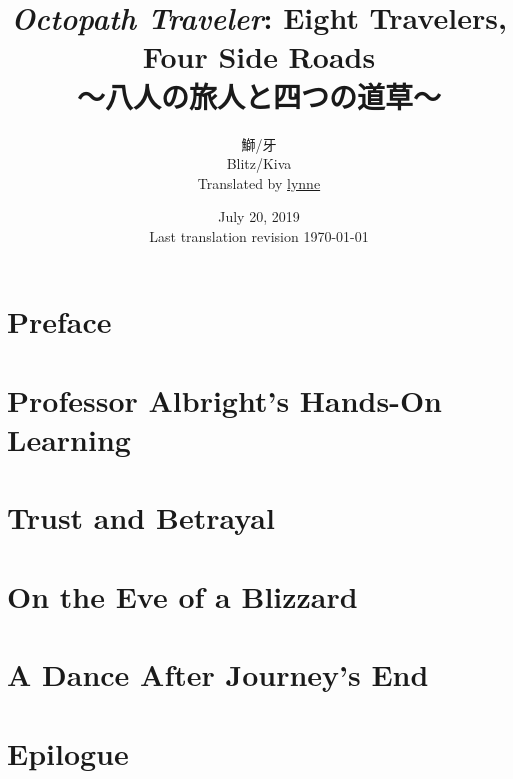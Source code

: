 \documentclass[a4paper,11pt]{memoir}
\title{%
\emph{Octopath Traveler}: Eight Travelers, Four Side Roads \\
\large{～八人の旅人と四つの道草～}
}
\author{%
鰤/牙 \\
Blitz/Kiva \\
Translated by \href{https://lynne.bearblog.dev}{lynne}
}
\date{%
July 20, 2019 \\
Last translation revision \today
}
\begin{document}
	\maketitle
	\pagebreak
	\tableofcontents*
	\frontmatter
	\chapter{Preface}
		
	\mainmatter
	\chapter{Professor Albright's Hands-On Learning}
		
	\chapter{Trust and Betrayal}
		
	\chapter{On the Eve of a Blizzard}
	\chapter{A Dance After Journey's End}
		
	\chapter{Epilogue}
\end{document}
